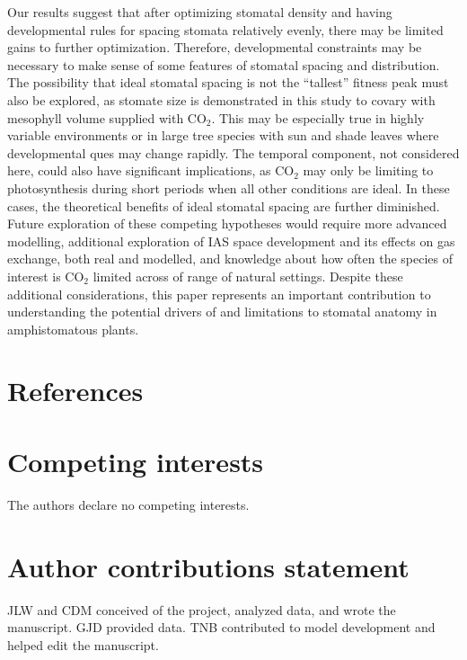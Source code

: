 \documentclass[webpdf,large,modern,unnumsec,namedate]{oup-authoring-template}
\begin{document}
Our results suggest that after optimizing stomatal density and having
developmental rules for spacing stomata relatively evenly, there may be
limited gains to further optimization. Therefore, developmental
constraints may be necessary to make sense of some features of stomatal
spacing and distribution. The possibility that ideal stomatal spacing is
not the ``tallest'' fitness peak must also be explored, as stomate size
is demonstrated in this study to covary with mesophyll volume supplied
with CO\(_2\). This may be especially true in highly variable
environments or in large tree species with sun and shade leaves where
developmental ques may change rapidly. The temporal component, not
considered here, could also have significant implications, as CO\(_2\)
may only be limiting to photosynthesis during short periods when all
other conditions are ideal. In these cases, the theoretical benefits of
ideal stomatal spacing are further diminished. Future exploration of
these competing hypotheses would require more advanced modelling,
additional exploration of IAS space development and its effects on gas
exchange, both real and modelled, and knowledge about how often the
species of interest is CO\(_2\) limited across of range of natural
settings. Despite these additional considerations, this paper represents
an important contribution to understanding the potential drivers of and
limitations to stomatal anatomy in amphistomatous plants.

\hypertarget{references}{%
\section{References}\label{references}}

\section{Competing interests}

The authors declare no competing interests.

\section{Author contributions statement}

JLW and CDM conceived of the project, analyzed data, and wrote the
manuscript. GJD provided data. TNB contributed to model development and
helped edit the manuscript.






\end{document}
